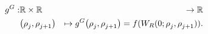 \begin{eqnarray*}
\god: & \mathbb{R}\times\mathbb{R} & \rightarrow\mathbb{R}\\
 & \left(\discrete{\xind}{},\discrete{\xind+1}{}\right) & \mapsto\god\left(\discrete{\xind}{},\discrete{\xind+1}{}\right)=f(W_{R}(0;\discrete{\xind}{},\discrete{\xind+1}{})).
\end{eqnarray*}



